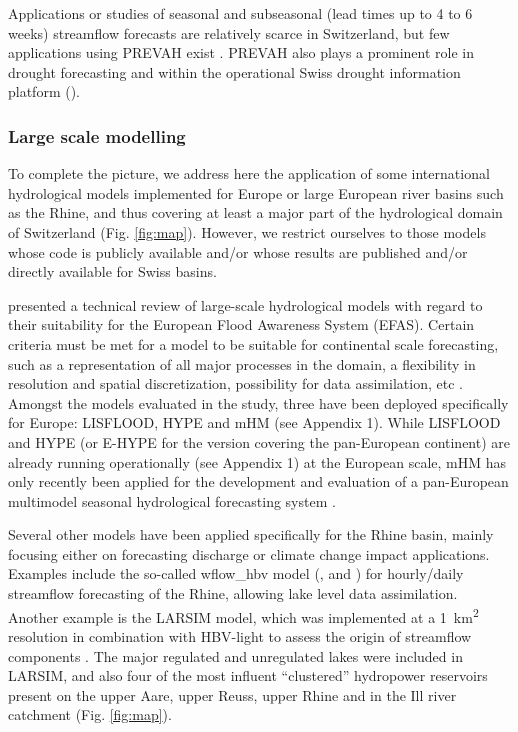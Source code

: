 \documentclass[10pt,a4paper]{article}
\begin{document}
Applications or studies of seasonal and subseasonal (lead times up to 4 to 6 weeks) streamflow forecasts are relatively scarce in Switzerland, but few applications using PREVAH exist \citep[][]{Monhart2019, Anghileri2019}. PREVAH also plays a prominent role in drought forecasting \citep{Fundel2013, JorgHess2015, Bogner2018b} and within the operational Swiss drought information platform (\citealp{Stahli2013}). 


\subsubsection{Large scale modelling}
\label{sec:application:largescale}

To complete the picture, we address here the application of some international hydrological models implemented for Europe or large European river basins such as the Rhine, and thus covering at least a major part of the hydrological domain of Switzerland (Fig. \ref{fig:map}). However, we restrict ourselves to those models whose code is publicly available and/or whose results are published and/or directly available for Swiss basins.

\citet{Kauffeldt2016} presented a technical review of large-scale hydrological models with regard to their suitability for the European Flood Awareness System (EFAS). Certain criteria must be met for a model to be suitable for continental scale forecasting, such as a representation of all major processes in the domain, a flexibility in resolution and spatial discretization, possibility for data assimilation, etc \citep{Kauffeldt2016}. Amongst the models evaluated in the study, three have been deployed specifically for Europe: LISFLOOD, HYPE and mHM (see Appendix 1). While LISFLOOD and HYPE (or E-HYPE for the version covering the pan-European continent) are already running operationally (see Appendix 1) at the European scale, mHM has only recently been applied for the development and evaluation of a pan-European multimodel seasonal hydrological forecasting system \citep{Wanders2019}.

Several other models have been applied specifically for the Rhine basin, mainly focusing either on forecasting discharge or climate change impact applications. Examples include the so-called wflow\_hbv model (\citealp{vanOsnabrugge2017}, \citealp{vanOsnabrugge2019} and \citealt{vanOsnabrugge2020}) for hourly/daily streamflow forecasting of the Rhine, allowing lake level data assimilation. Another example is the LARSIM model, which was implemented at a 1~km\textsuperscript{2} resolution in combination with HBV-light to assess the origin of streamflow components \citep{Stahl2017}. The major regulated and unregulated lakes were included in LARSIM, and also four of the most influent ``clustered'' hydropower reservoirs present on the upper Aare, upper Reuss, upper Rhine and in the Ill river catchment (Fig. \ref{fig:map}).
\end{document}
